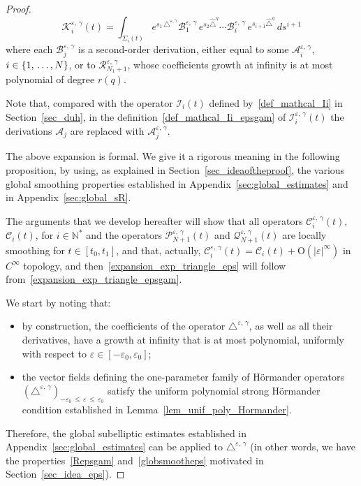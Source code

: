 \documentclass[10pt]{amsart}
\theoremstyle{definition}\newtheorem{defi}[theo]{Definition}\newtheorem{rema}[theo]{Remark}\newtheorem{exam}[theo]{Example}\newtheorem{exem}[theo]{Example}\newtheorem{nota}[theo]{Notation}
\newcommand*\N{\mathbb{N}}
\newcommand{\calQ}{\mathcal{Q}}
\newcommand{\calK}{\mathcal{K}}
\newcommand{\calA}{\mathcal{A}}
\newcommand{\calR}{\mathcal{R}}
\newcommand{\calC}{\mathcal{C}}
\newcommand{\calI}{\mathcal{I}}
\newcommand{\calP}{\mathcal{P}}
\newcommand{\calB}{\mathcal{B}}
\newcommand{\rmO}{\mathrm{O}}
\renewcommand{\leq}{\leqslant}
\begin{document}
\begin{proof}
\begin{equation}
\end{equation}
\begin{equation}\label{def_mathcal_Kiepsgam}
\calK_i^{\varepsilon,\,\gamma}(t) = \int_{\Sigma_i(t)} e^{s_1 \,\triangle^{\varepsilon,\gamma}} \calB_{1}^{\varepsilon,\,\gamma} \, e^{s_2 \widehat{\triangle}^{q}} \cdots \calB_i^{\varepsilon,\,\gamma} \, e^{s_{i+1} \widehat{\triangle}^{q}} \, ds^{i+1}
\end{equation}
where each $\calB_{j}^{\varepsilon,\,\gamma}$ is a second-order derivation, either equal to some $\calA_i^{\varepsilon,\,\gamma}$, $i\in\{1,\,\ldots,\linebreak N\}$, or to $\calR_{N_1+1}^{\varepsilon,\,\gamma}$, whose coefficients growth at infinity is at most polynomial of degree $r(q)$.

Note that, compared with the operator $\calI_i(t)$ defined by~\eqref{def_mathcal_Ii} in Section~\ref{sec_duh}, in the definition~\eqref{def_mathcal_Ii_epsgam} of $\calI_i^{\varepsilon,\,\gamma}(t)$ the derivations $\calA_j$ are replaced with $\calA_j^{\varepsilon,\,\gamma}$.

The above expansion is formal. We give it a rigorous meaning in the following proposition, by using, as explained in Section~\ref{sec_ideaoftheproof}, the various global smoothing properties established in Appendix~\ref{sec:global_estimates} and in Appendix~\ref{sec:global_sR}.

The arguments that we develop hereafter will show that all operators $\calC_i^{\varepsilon,\,\gamma}(t)$, $\calC_i(t)$, for $i\in\N^*$ and the operators $\calP_{N+1}^{\varepsilon,\,\gamma}(t)$ and $\calQ_{N+1}^{\varepsilon,\,\gamma}(t)$ are locally smoothing for $t\in[t_0,t_1]$, and that, actually, $\calC_i^{\varepsilon,\,\gamma}(t) = \calC_i(t) + \rmO(\vert\varepsilon\vert^\infty)$ in $C^\infty$ topology, and then~\eqref{expansion_exp_triangle_eps} will follow from~\eqref{expansion_exp_triangle_epsgam}.

We start by noting that:
\begin{itemize}
\item by construction, the coefficients of the operator $\triangle^{\varepsilon,\,\gamma}$, as well as all their derivatives, have a growth at infinity that is at most polynomial, uniformly with respect to $\varepsilon\in[-\varepsilon_0,\varepsilon_0]$;
\item the vector fields defining the one-parameter family of H\"ormander operators $(\triangle^{\varepsilon,\,\gamma})_{-\varepsilon_0\,\leq\,\varepsilon\,\leq\,\varepsilon_0}$ satisfy the uniform polynomial strong H\"ormander condition established in Lemma~\ref{lem_unif_poly_Hormander}.
\end{itemize}
Therefore, the global subelliptic estimates established in Appendix~\ref{sec:global_estimates} can be applied to $\triangle^{\varepsilon,\,\gamma}$ (in other words, we have the properties~\eqref{Repsgam} and~\eqref{globsmootheps} motivated in Section~\ref{sec_idea_eps}).


\end{proof}
\end{document}
